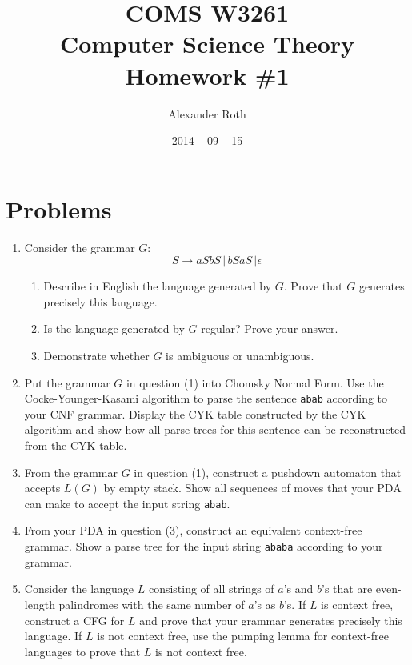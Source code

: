 \documentclass[]{article}
\begin{document}
\newtheorem{thm}{Theorem}

\title{COMS W3261 \\ Computer Science Theory \\ Homework \#1}
\author{Alexander Roth}
\date{2014 -- 09 -- 15}
\maketitle

\section*{Problems}
  \begin{enumerate}
    \item Consider the grammar $G$:
      \[ S \rightarrow a S b S \, | \, b S a S \, | \epsilon \]
      \begin{enumerate}
        \item Describe in English the language generated by $G$. Prove that $G$ 
        generates precisely this language.
        \item Is the language generated by $G$ regular? Prove your answer.
        \item Demonstrate whether $G$ is ambiguous or unambiguous.
      \end{enumerate}
    \item Put the grammar $G$ in question (1) into Chomsky Normal Form. Use the 
    Cocke-Younger-Kasami algorithm to parse the sentence \texttt{abab} according 
    to your CNF grammar. Display the CYK table constructed by the CYK algorithm 
    and show how all parse trees for this sentence can be reconstructed from the 
    CYK table.
    \item From the grammar $G$ in question (1), construct a pushdown automaton 
    that accepts $L(G)$ by empty stack. Show all sequences of moves that your 
    PDA can make to accept the input string \texttt{abab}.
    \item From your PDA in question (3), construct an equivalent context-free 
    grammar. Show a parse tree for the input string \texttt{ababa} according to 
    your grammar.
    \item Consider the language $L$ consisting of all strings of $a$'s and $b$'s 
    that are even-length palindromes with the same number of $a$'s as $b$'s. If 
    $L$ is context free, construct a CFG for $L$ and prove that your grammar 
    generates precisely this language. If $L$ is not context free, use the 
    pumping lemma for context-free languages to prove that $L$ is not context 
    free.
  \end{enumerate}
\end{document}
